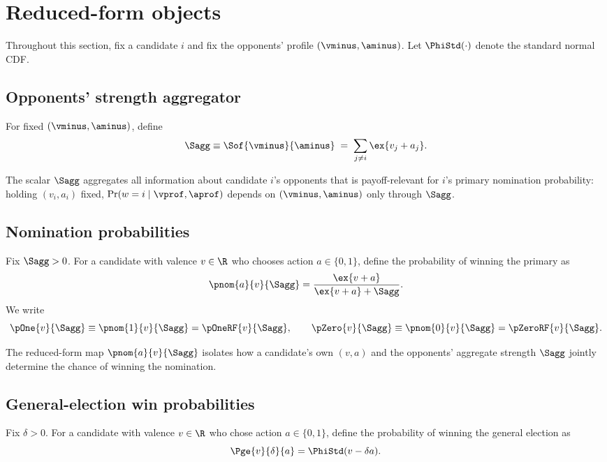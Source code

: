 \section{Reduced-form objects}

Throughout this section, fix a candidate $i$ and fix the opponents' profile $(\vminus,\aminus)$.
Let $\PhiStd(\cdot)$ denote the standard normal CDF.

\subsection{Opponents' strength aggregator}
\begin{definition}\label{def:Sof}
For fixed $(\vminus,\aminus)$, define
\[
    \Sagg \equiv \Sof{\vminus}{\aminus} \;=\; \sum_{j\neq i} \ex{v_j + a_j}.
\]
\end{definition}

\begin{remark*}
The scalar $\Sagg$ aggregates all information about candidate $i$'s opponents that is payoff-relevant for $i$'s primary nomination probability: holding $(v_i,a_i)$ fixed, $\Pr(w=i\mid\vprof,\aprof)$ depends on $(\vminus,\aminus)$ only through $\Sagg$.
\end{remark*}

\subsection{Nomination probabilities}
\begin{definition}\label{def:pnomRF}
Fix $\Sagg>0$. For a candidate with valence $v\in\R$ who chooses action $a\in\{0,1\}$, define the probability of winning the primary as
\[
    \pnom{a}{v}{\Sagg} = \frac{\ex{v+a}}{\ex{v+a}+\Sagg}.
\]
We write
\[
    \pOne{v}{\Sagg} \equiv \pnom{1}{v}{\Sagg} = \pOneRF{v}{\Sagg},
    \qquad
    \pZero{v}{\Sagg} \equiv \pnom{0}{v}{\Sagg} = \pZeroRF{v}{\Sagg}.
\]
\end{definition}


The reduced-form map $\pnom{a}{v}{\Sagg}$ isolates how a candidate's own $(v,a)$ and the opponents' aggregate strength $\Sagg$ jointly determine the chance of winning the nomination.


\subsection{General-election win probabilities}
\begin{definition}\label{def:PgeRF}
Fix $\delta>0$. For a candidate with valence $v\in\R$ who chose action $a\in\{0,1\}$, define the probability of winning the general election as
\[
    \Pge{v}{\delta}{a} = \PhiStd(v-\delta a).
\]
\end{definition}


